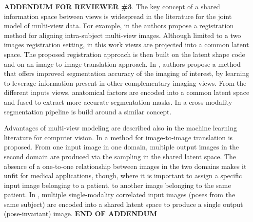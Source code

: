 \textbf{ADDENDUM FOR REVIEWER \#3}.
The key concept of a shared information space between views is widespread in the literature for the joint model of multi-view data.
For example, in \cite{Qin2019} the authors propose
a registration method for aligning intra-subject multi-view images.
Although limited to a two images registration setting,
in this work views are projected into a common latent space.
The proposed registration approach is then built on the latent shape code and on an image-to-image translation approach.
%
%
In \cite{Chartsias2021}, authors propose
a method that offers improved segmentation accuracy of the imaging of interest, by learning to leverage information present in other complementary imaging views.
From the different inputs views, anatomical factors are encoded into a common latent space and fused to extract more accurate segmentation masks.
%
%
In \cite{Yang2020} a cross-modality segmentation pipeline is build around a similar concept.

Advantages of multi-view modeling are described also in the machine learning literature for computer vision.
%
In \cite{Huang2018}
a method for image-to-image translation is proposed.
From one input image in one domain, multiple output images in the second domain are produced via the sampling in the shared latent space.
The absence of a one-to-one relationship between images in the two domains makes it unfit for medical applications, though,
where it is important to assign a specific input image belonging to a patient, to another image belonging to the same patient.
In \cite{Tran2017},
multiple single-modality correlated input images (poses from the same subject) are encoded into a shared latent space to produce a single output (pose-invariant) image.
\textbf{END OF ADDENDUM} \\

